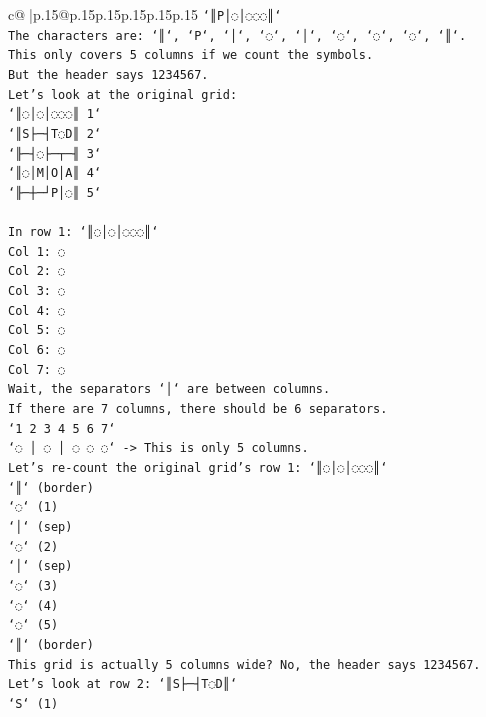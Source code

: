 \documentclass{article}
\begin{document}
{\begin{supertabular}{c@{$\;$}|p{.15\linewidth}@{}p{.15\linewidth}p{.15\linewidth}p{.15\linewidth}p{.15\linewidth}p{.15\linewidth}}
{{{\texttt{`║P│◌│◌◌◌║`} \\
\texttt{The characters are: `║`, `P`, `│`, `◌`, `│`, `◌`, `◌`, `◌`, `║`.} \\
\texttt{This only covers 5 columns if we count the symbols.} \\
\texttt{But the header says 1234567.} \\
\texttt{Let's look at the original grid:} \\
\texttt{`║◌│◌│◌◌◌║ 1`} \\
\texttt{`║S├─┤T◌D║ 2`} \\
\texttt{`╟─┤◌├─┬─╢ 3`} \\
\texttt{`║◌│M│O│A║ 4`} \\
\texttt{`╟─┼─┘P│◌║ 5`} \\
\\ 
\texttt{In row 1: `║◌│◌│◌◌◌║`} \\
\texttt{Col 1: ◌} \\
\texttt{Col 2: ◌} \\
\texttt{Col 3: ◌} \\
\texttt{Col 4: ◌} \\
\texttt{Col 5: ◌} \\
\texttt{Col 6: ◌} \\
\texttt{Col 7: ◌} \\
\texttt{Wait, the separators `│` are between columns.} \\
\texttt{If there are 7 columns, there should be 6 separators.} \\
\texttt{`1 2 3 4 5 6 7`} \\
\texttt{`◌ │ ◌ │ ◌ ◌ ◌` {-}> This is only 5 columns.} \\
\texttt{Let's re{-}count the original grid's row 1: `║◌│◌│◌◌◌║`} \\
\texttt{`║` (border)} \\
\texttt{`◌` (1)} \\
\texttt{`│` (sep)} \\
\texttt{`◌` (2)} \\
\texttt{`│` (sep)} \\
\texttt{`◌` (3)} \\
\texttt{`◌` (4)} \\
\texttt{`◌` (5)} \\
\texttt{`║` (border)} \\
\texttt{This grid is actually 5 columns wide? No, the header says 1234567.} \\
\texttt{Let's look at row 2: `║S├─┤T◌D║`} \\
\texttt{`S` (1)} \\
}}}
\end{supertabular}}
\end{document}
